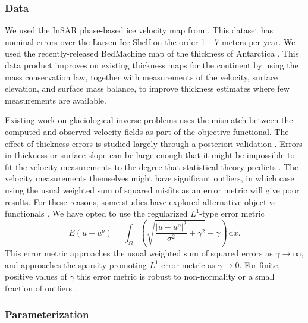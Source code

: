 \documentclass{article}
\theoremstyle{definition}
\theoremstyle{plain}
\newcommand{\ud}{\hspace{2pt}\mathrm{d}}
\begin{document}
\subsubsection{Data}

We used the InSAR phase-based ice velocity map from \citet{mouginot2019continent}.
This dataset has nominal errors over the Larsen Ice Shelf on the order 1 -- 7 meters per year.
We used the recently-released BedMachine map of the thickness of Antarctica \citep{morlighem2019deep}.
This data product improves on existing thickness maps for the continent by using the mass conservation law, together with measurements of the velocity, surface elevation, and surface mass balance, to improve thickness estimates where few measurements are available.

Existing work on glaciological inverse problems uses the mismatch between the computed and observed velocity fields as part of the objective functional.
The effect of thickness errors is studied largely through a posteriori validation \citep{joughin2004basal, larour2005rheology}.
Errors in thickness or surface slope can be large enough that it might be impossible to fit the velocity measurements to the degree that statistical theory predicts \citep{macayeal1995basal}.
The velocity measurements themselves might have significant outliers, in which case using the usual weighted sum of squared misfits as an error metric will give poor results.
For these reasons, some studies have explored alternative objective functionals \citep{morlighem2010spatial}.
We have opted to use the regularized $L^1$-type error metric
\begin{equation}
    E(u - u^o) = \int_\Omega\left(\sqrt{\frac{|u - u^o|^2}{\sigma^2} + \gamma^2} - \gamma\right)\ud x.
    \label{eq:l1-error-metric}
\end{equation}
This error metric approaches the usual weighted sum of squared errors as $\gamma \to \infty$, and approaches the sparsity-promoting $L^1$ error metric as $\gamma \to 0$.
For finite, positive values of $\gamma$ this error metric is robust to non-normality or a small fraction of outliers \citep{barron2019general}.


\subsubsection{Parameterization}
\end{document}
